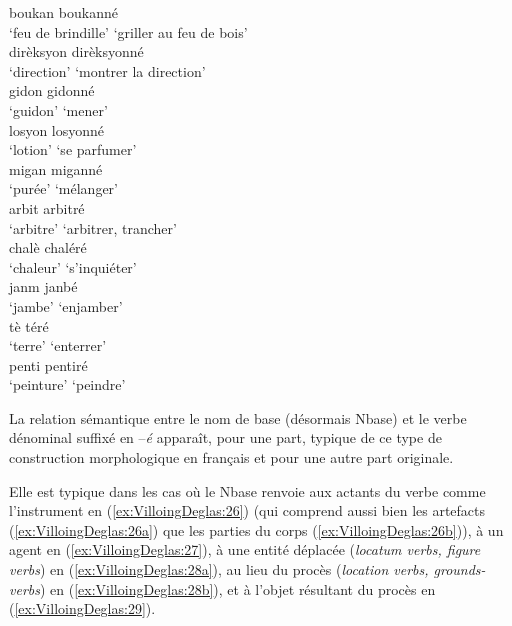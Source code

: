\documentclass[output=paper]{langsci/langscibook}
\begin{document}
\ea \label{ex:VilloingDeglas:25b}
  \ea \gll boukan \textrightarrow{~} boukanné\\
  {`feu de brindille'} {} {`griller au feu de bois'}\\
  \ex \gll dirèksyon \textrightarrow{~} dirèksyonné\\
  {`direction'} {} {`montrer la direction'}\\
  \ex \gll gidon \textrightarrow{~} gidonné\\
  {`guidon'} {} {`mener'}\\
  \ex \gll losyon \textrightarrow{~} losyonné\\
  `lotion' {} {`se parfumer'}\\
  \ex \gll migan \textrightarrow{~} miganné\\
  {`purée'} {} {`mélanger'}\\
  \z
\ex \label{ex:VilloingDeglas:25c}
  \ea \gll arbit \textrightarrow{~} arbitré\\
  `arbitre' {} {`arbitrer, trancher'}\\
  \ex \gll chalè \textrightarrow{~} chaléré\\
  {`chaleur'} {} {`s'inquiéter'}\\
  \ex \gll janm \textrightarrow{~} janbé\\
  {`jambe'} {} {`enjamber'}\\
  \ex \gll tè \textrightarrow{~} téré\\
  {`terre'} {} {`enterrer'}\\
  \ex \gll penti \textrightarrow{~} pentiré\\
  {`peinture'} {} {`peindre'}\\
\z
\z

\label{propriétés-sémantiques-de-la-ruxe8gle}

La relation sémantique entre le nom de base (désormais Nbase) et le
verbe dénominal suffixé en --\emph{é}  apparaît, pour une part, typique
de ce type de construction morphologique en français et pour une autre
part originale.

Elle est typique dans les cas où le Nbase renvoie aux actants du verbe
comme l'instrument en (\ref{ex:VilloingDeglas:26}) (qui comprend aussi bien les artefacts (\ref{ex:VilloingDeglas:26a})
que les parties du corps (\ref{ex:VilloingDeglas:26b})), à un agent en (\ref{ex:VilloingDeglas:27}), à une entité
déplacée (\emph{locatum verbs, figure verbs}) en (\ref{ex:VilloingDeglas:28a}), au lieu du
procès (\emph{location verbs, grounds-verbs}) en (\ref{ex:VilloingDeglas:28b}), et à l'objet
résultant du procès en (\ref{ex:VilloingDeglas:29}).
\end{document}
